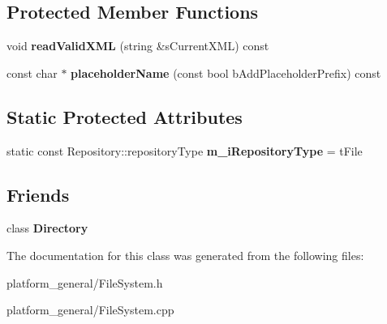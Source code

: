 \subsection*{\-Protected \-Member \-Functions}
\begin{DoxyCompactItemize}
\item 
\hypertarget{classgeneral__server_1_1File_a7b8e47cf25458a9c98b65ef0b944c4ff}{void {\bfseries read\-Valid\-X\-M\-L} (string \&s\-Current\-X\-M\-L) const }\label{classgeneral__server_1_1File_a7b8e47cf25458a9c98b65ef0b944c4ff}

\item 
\hypertarget{classgeneral__server_1_1File_aa700d21d8770be803002a519c53be859}{const char $\ast$ {\bfseries placeholder\-Name} (const bool b\-Add\-Placeholder\-Prefix) const }\label{classgeneral__server_1_1File_aa700d21d8770be803002a519c53be859}

\end{DoxyCompactItemize}
\subsection*{\-Static \-Protected \-Attributes}
\begin{DoxyCompactItemize}
\item 
\hypertarget{classgeneral__server_1_1File_a68e7ab3dd702780bd243bfd6553cdec6}{static const \*
\-Repository\-::repository\-Type {\bfseries m\-\_\-i\-Repository\-Type} = t\-File}\label{classgeneral__server_1_1File_a68e7ab3dd702780bd243bfd6553cdec6}

\end{DoxyCompactItemize}
\subsection*{\-Friends}
\begin{DoxyCompactItemize}
\item 
\hypertarget{classgeneral__server_1_1File_a245303e8660be5fb8eb2828a8c44b773}{class {\bfseries \-Directory}}\label{classgeneral__server_1_1File_a245303e8660be5fb8eb2828a8c44b773}

\end{DoxyCompactItemize}


\-The documentation for this class was generated from the following files\-:\begin{DoxyCompactItemize}
\item 
platform\-\_\-general/\-File\-System.\-h\item 
platform\-\_\-general/\-File\-System.\-cpp\end{DoxyCompactItemize}
